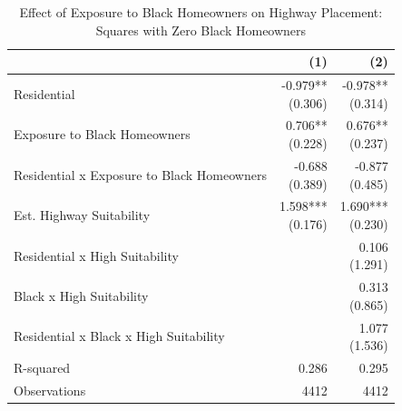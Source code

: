 \begin{table}[h]
\centering
\caption{Effect of Exposure to Black Homeowners on Highway Placement: Squares with Zero Black Homeowners}
\label{tab:results/black_homeowners_no_black}
\begin{threeparttable}
\begin{tabular*}{0.8\textwidth}{@{\extracolsep{\fill}}l*{2}{r}}
\toprule
 & (1) & (2) \\
\midrule
Residential & \makecell[tr]{-0.979{**} \\ (0.306)} & \makecell[tr]{-0.978{**} \\ (0.314)} \\
Exposure to Black Homeowners & \makecell[tr]{0.706{**} \\ (0.228)} & \makecell[tr]{0.676{**} \\ (0.237)} \\
Residential x Exposure to Black Homeowners & \makecell[tr]{-0.688 \\ (0.389)} & \makecell[tr]{-0.877 \\ (0.485)} \\
Est. Highway Suitability & \makecell[tr]{1.598{***} \\ (0.176)} & \makecell[tr]{1.690{***} \\ (0.230)} \\
Residential x High Suitability &  & \makecell[tr]{0.106 \\ (1.291)} \\
Black x High Suitability &  & \makecell[tr]{0.313 \\ (0.865)} \\
Residential x Black x High Suitability &  & \makecell[tr]{1.077 \\ (1.536)} \\
R-squared & 0.286 & 0.295 \\
Observations & 4412 & 4412 \\
\bottomrule
\end{tabular*}
\begin{tablenotes}[flushleft]
\footnotesize

\end{tablenotes}
\end{threeparttable}
\end{table}
